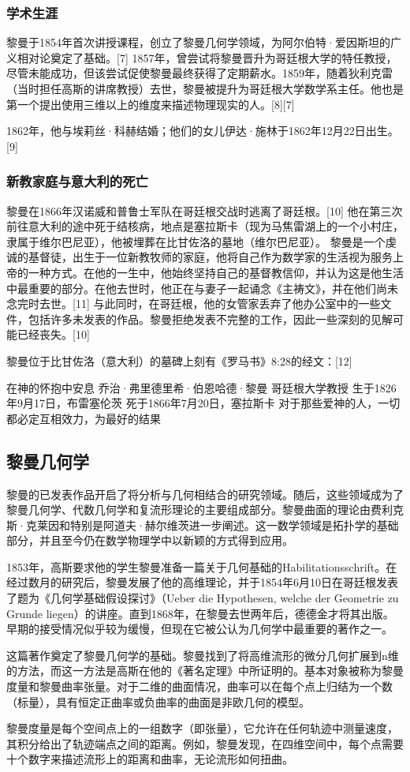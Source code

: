 \subsubsection{学术生涯}  
黎曼于1854年首次讲授课程，创立了黎曼几何学领域，为阿尔伯特·爱因斯坦的广义相对论奠定了基础。[7] 1857年，曾尝试将黎曼晋升为哥廷根大学的特任教授，尽管未能成功，但该尝试促使黎曼最终获得了定期薪水。1859年，随着狄利克雷（当时担任高斯的讲席教授）去世，黎曼被提升为哥廷根大学数学系主任。他也是第一个提出使用三维以上的维度来描述物理现实的人。[8][7]

1862年，他与埃莉丝·科赫结婚；他们的女儿伊达·施林于1862年12月22日出生。[9]
\subsubsection{新教家庭与意大利的死亡}
黎曼在1866年汉诺威和普鲁士军队在哥廷根交战时逃离了哥廷根。[10] 他在第三次前往意大利的途中死于结核病，地点是塞拉斯卡（现为马焦雷湖上的一个小村庄，隶属于维尔巴尼亚），他被埋葬在比甘佐洛的墓地（维尔巴尼亚）。  
黎曼是一个虔诚的基督徒，出生于一位新教牧师的家庭，他将自己作为数学家的生活视为服务上帝的一种方式。在他的一生中，他始终坚持自己的基督教信仰，并认为这是他生活中最重要的部分。在他去世时，他正在与妻子一起诵念《主祷文》，并在他们尚未念完时去世。[11] 与此同时，在哥廷根，他的女管家丢弃了他办公室中的一些文件，包括许多未发表的作品。黎曼拒绝发表不完整的工作，因此一些深刻的见解可能已经丧失。[10]

黎曼位于比甘佐洛（意大利）的墓碑上刻有《罗马书》8:28的经文：[12]

在神的怀抱中安息
乔治·弗里德里希·伯恩哈德·黎曼
哥廷根大学教授
生于1826年9月17日，布雷塞伦茨
死于1866年7月20日，塞拉斯卡
对于那些爱神的人，一切都必定互相效力，为最好的结果
\subsection{黎曼几何学}
黎曼的已发表作品开启了将分析与几何相结合的研究领域。随后，这些领域成为了黎曼几何学、代数几何学和复流形理论的主要组成部分。黎曼曲面的理论由费利克斯·克莱因和特别是阿道夫·赫尔维茨进一步阐述。这一数学领域是拓扑学的基础部分，并且至今仍在数学物理学中以新颖的方式得到应用。

1853年，高斯要求他的学生黎曼准备一篇关于几何基础的Habilitationsschrift。在经过数月的研究后，黎曼发展了他的高维理论，并于1854年6月10日在哥廷根发表了题为《几何学基础假设探讨》（Ueber die Hypothesen, welche der Geometrie zu Grunde liegen）的讲座。直到1868年，在黎曼去世两年后，德德金才将其出版。早期的接受情况似乎较为缓慢，但现在它被公认为几何学中最重要的著作之一。

这篇著作奠定了黎曼几何学的基础。黎曼找到了将高维流形的微分几何扩展到n维的方法，而这一方法是高斯在他的《著名定理》中所证明的。基本对象被称为黎曼度量和黎曼曲率张量。对于二维的曲面情况，曲率可以在每个点上归结为一个数（标量），具有恒定正曲率或负曲率的曲面是非欧几何的模型。

黎曼度量是每个空间点上的一组数字（即张量），它允许在任何轨迹中测量速度，其积分给出了轨迹端点之间的距离。例如，黎曼发现，在四维空间中，每个点需要十个数字来描述流形上的距离和曲率，无论流形如何扭曲。